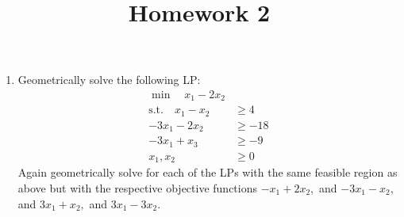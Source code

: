 \documentclass{article}
\begin{document}
\title{Homework 2}
\maketitle
\thispagestyle{fancy}

\begin{enumerate}
	\item Geometrically solve the following LP:
		\begin{align*}
			\min \quad x_1-2x_2 & \\
			\text{s.t.}\quad x_1-x_2&\ge 4 \\
			-3x_1-2x_2&\ge -18 \\
			-3x_1+x_3&\ge-9 \\
			x_1, x_2 &\ge 0
		\end{align*}
		Again geometrically solve for each of the LPs with the same feasible region as above but with the respective objective functions $-x_1+2x_2,$ and $-3x_1-x_2,$ and $3x_1+x_2,$ and $3x_1-3x_2.$ 


\end{enumerate}
\end{document}
